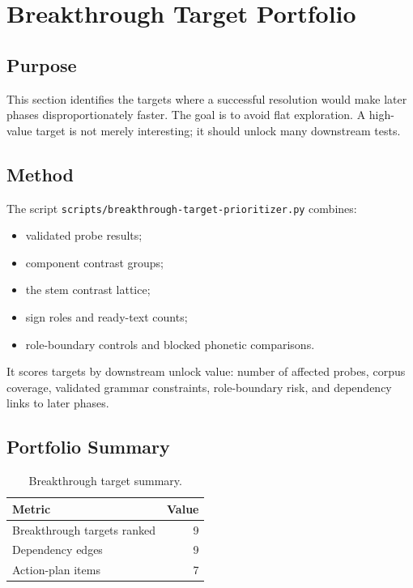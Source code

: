 \section{Breakthrough Target Portfolio}

\subsection{Purpose}

This section identifies the targets where a successful resolution would make later phases disproportionately faster. The goal is to avoid flat exploration. A high-value target is not merely interesting; it should unlock many downstream tests.

\subsection{Method}

The script \texttt{scripts/breakthrough-target-prioritizer.py} combines:

\begin{itemize}
  \item validated probe results;
  \item component contrast groups;
  \item the stem contrast lattice;
  \item sign roles and ready-text counts;
  \item role-boundary controls and blocked phonetic comparisons.
\end{itemize}

It scores targets by downstream unlock value: number of affected probes, corpus coverage, validated grammar constraints, role-boundary risk, and dependency links to later phases.

\subsection{Portfolio Summary}

\begin{table}[htbp]
\centering
\begin{tabular}{lr}
\toprule
\textbf{Metric} & \textbf{Value} \\
\midrule
Breakthrough targets ranked & 9 \\
Dependency edges & 9 \\
Action-plan items & 7 \\
\bottomrule
\end{tabular}
\caption{Breakthrough target summary.}
\label{tab:breakthrough-target-summary}
\end{table}

